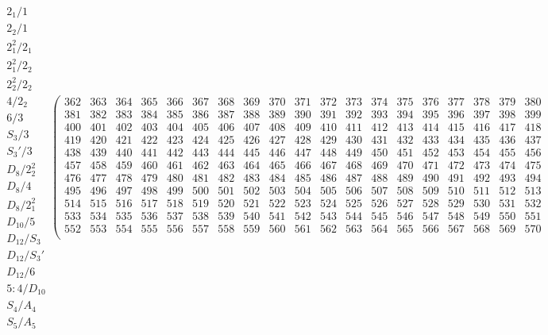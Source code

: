 \documentclass[11pt,a4paper]{amsart}
\begin{document}
\begin{align*}
\begin{array}{c}%
2_1/1 \\ \hline
2_2/1 \\ \hline
2^2_1/2_1 \\ \hline
2^2_1/2_2 \\ \hline
2^2_2/2_2 \\ \hline
4/2_2 \\ \hline
6/3 \\ \hline
S_3/3 \\ \hline
S_3'/3 \\ \hline
D_8/2^2_2 \\ \hline
D_8/4 \\ \hline
D_8/2^2_1 \\ \hline
D_{10}/5 \\ \hline
D_{12}/S_3 \\ \hline
D_{12}/S_3' \\ \hline
D_{12}/6 \\ \hline
5{:}4/D_{10} \\ \hline
S_4/A_4 \\ \hline
S_5/A_5
\end{array}
  \left(\begin{array}{r|r|r|r|r|r|r|r|r|r|r|r|r|r|r|r|r|r|r}%
362&363&364&365&366&367&368&369&370&371&372&373&374&375&376&377&378&379&380\\%
\hline
381&382&383&384&385&386&387&388&389&390&391&392&393&394&395&396&397&398&399\\%
\hline
400&401&402&403&404&405&406&407&408&409&410&411&412&413&414&415&416&417&418\\%
\hline
419&420&421&422&423&424&425&426&427&428&429&430&431&432&433&434&435&436&437\\%
\hline
438&439&440&441&442&443&444&445&446&447&448&449&450&451&452&453&454&455&456\\%
\hline
457&458&459&460&461&462&463&464&465&466&467&468&469&470&471&472&473&474&475\\%
\hline
476&477&478&479&480&481&482&483&484&485&486&487&488&489&490&491&492&493&494\\%
\hline
495&496&497&498&499&500&501&502&503&504&505&506&507&508&509&510&511&512&513\\%
\hline
514&515&516&517&518&519&520&521&522&523&524&525&526&527&528&529&530&531&532\\%
\hline
533&534&535&536&537&538&539&540&541&542&543&544&545&546&547&548&549&550&551\\%
\hline
552&553&554&555&556&557&558&559&560&561&562&563&564&565&566&567&568&569&570\\%

\end{array}
\end{align*}
\end{document}
